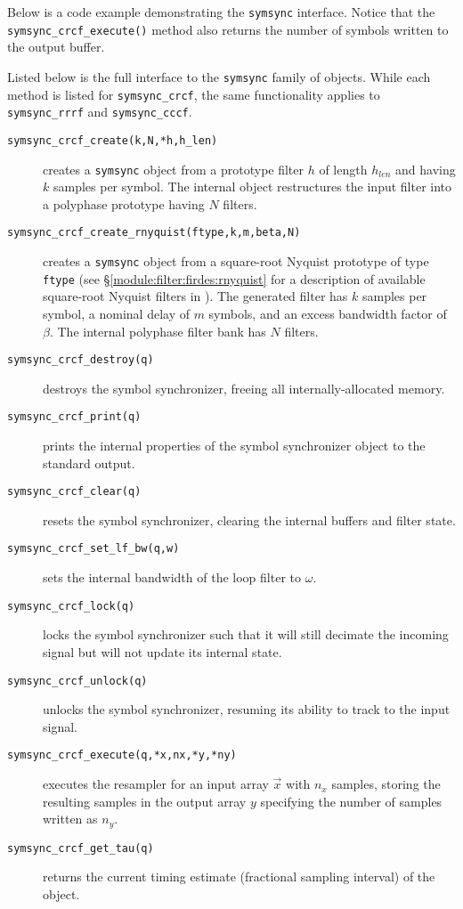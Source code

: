 Below is a code example demonstrating the {\tt symsync} interface.
Notice that the {\tt symsync\_crcf\_execute()} method also returns the
number of symbols written to the output buffer.
%

%
Listed below is the full interface to the {\tt symsync} family of
objects.
While each method is listed for {\tt symsync\_crcf}, the same
functionality applies to {\tt symsync\_rrrf} and {\tt symsync\_cccf}.
%
\begin{description}
\item[{\tt symsync\_crcf\_create(k,N,*h,h\_len)}]
    creates a {\tt symsync} object from a prototype filter $h$ of length
    $h_{len}$ and having $k$ samples per symbol.
    The internal object restructures the input filter into a polyphase
    prototype having $N$ filters.
\item[{\tt symsync\_crcf\_create\_rnyquist(ftype,k,m,beta,N)}]
    creates a {\tt symsync} object from a square-root Nyquist prototype
    of type {\tt ftype} (see \S\ref{module:filter:firdes:rnyquist}
    for a description of available square-root Nyquist filters in
    \liquid).
    The generated filter has $k$ samples per symbol,
    a nominal delay of $m$ symbols, and an excess bandwidth factor of
    $\beta$.
    The internal polyphase filter bank has $N$ filters.
\item[{\tt symsync\_crcf\_destroy(q)}]
    destroys the symbol synchronizer, freeing all internally-allocated
    memory.
\item[{\tt symsync\_crcf\_print(q)}]
    prints the internal properties of the symbol synchronizer object to
    the standard output.
\item[{\tt symsync\_crcf\_clear(q)}]
    resets the symbol synchronizer, clearing the internal buffers and
    filter state.
\item[{\tt symsync\_crcf\_set\_lf\_bw(q,w)}]
    sets the internal bandwidth of the loop filter to $\omega$.
\item[{\tt symsync\_crcf\_lock(q)}]
    locks the symbol synchronizer such that it will still decimate the
    incoming signal but will not update its internal state.
\item[{\tt symsync\_crcf\_unlock(q)}]
    unlocks the symbol synchronizer, resuming its ability to track to
    the input signal.
\item[{\tt symsync\_crcf\_execute(q,*x,nx,*y,*ny)}]
    executes the resampler for an input array $\vec{x}$ with $n_x$
    samples,
    storing the resulting samples in the output array $y$
    specifying the number of samples written as $n_y$.
\item[{\tt symsync\_crcf\_get\_tau(q)}]
    returns the current timing estimate (fractional sampling interval)
    of the object.
\end{description}
